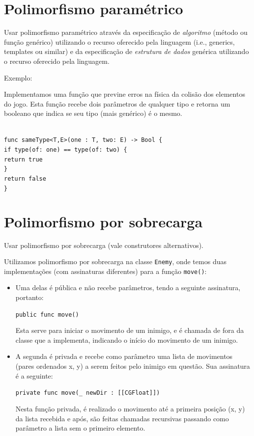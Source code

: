 \documentclass[rel_mlp]{iiufrgs}
\newcommand\tab[1][1cm]{\hspace*{#1}}
\begin{document}

\section{Polimorfismo paramétrico}

Usar polimorfismo paramétrico através da especificação de \textit{algoritmo} (método ou função genérico) utilizando o recurso oferecido pela linguagem (i.e., generics, templates ou similar) e da especificação de \textit{estrutura de dados} genérica utilizando o recurso oferecido pela linguagem.

Exemplo:

Implementamos uma função que previne erros na física da colisão dos elementos do jogo. Esta função recebe dois parâmetros de qualquer tipo e retorna um booleano que indica se seu tipo (mais genérico) é o mesmo.

\texttt{\\func sameType<T,E>(one : T, two: E) -> Bool \{\\\tab if type(of: one) == type(of: two) \{\\\tab \tab return true\\\tab\}\\\tab return false\\\}}



\section{Polimorfismo por sobrecarga}

Usar polimorfismo por sobrecarga (vale construtores alternativos).

Utilizamos polimorfismo por sobrecarga na classe \texttt{Enemy}, onde temos duas implementações (com assinaturas diferentes) para a função \texttt{move()}:

\begin{itemize}
\setlength{\itemindent}{1em}
    \item Uma delas é pública e não recebe parâmetros, tendo a seguinte assinatura, portanto:
    
    \texttt{public func move()}
    
    Esta serve para iniciar o movimento de um inimigo, e é chamada de fora da classe que a implementa, indicando o início do movimento de um inimigo.
    
    \item A segunda é privada e recebe como parâmetro uma lista de movimentos (pares ordenados x, y) a serem feitos pelo inimigo em questão. Sua assinatura é a seguinte:
    
    \texttt{private func move(\_ newDir : [[CGFloat]])}
    
    Nesta função privada, é realizado o movimento até a primeira posição (x, y) da lista recebida e após, são feitas chamadas recursivas passando como parâmetro a lista sem o primeiro elemento.
\end{itemize}
\end{document}
